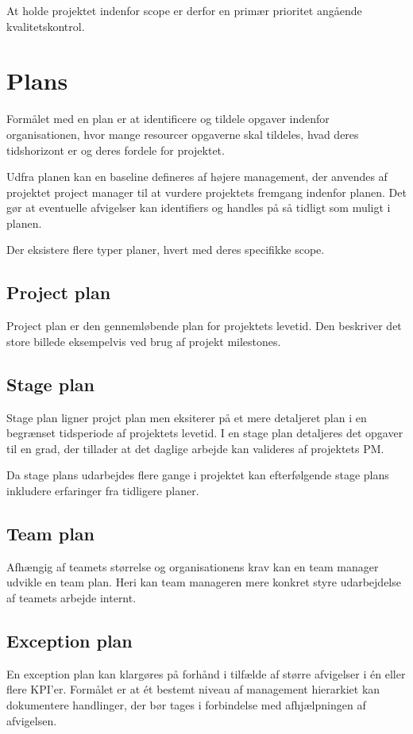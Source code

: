 At holde projektet indenfor scope er derfor en primær prioritet angående kvalitetskontrol.

\section{Plans}
\label{sec:plans}
Formålet med en plan er at identificere og tildele opgaver indenfor organisationen, hvor mange resourcer opgaverne skal tildeles, hvad deres tidshorizont er og deres fordele for projektet.

Udfra planen kan en baseline defineres af højere management, der anvendes af projektet project manager til at vurdere projektets fremgang indenfor planen. Det gør at eventuelle afvigelser kan identifiers og handles på så tidligt som muligt i planen.

Der eksistere flere typer planer, hvert med deres specifikke scope.

\subsection*{Project plan}
Project plan er den gennemløbende plan for projektets levetid. Den beskriver det store billede eksempelvis ved brug af projekt milestones.

\subsection*{Stage plan}
Stage plan ligner projct plan men eksiterer på et mere detaljeret plan i en begrænset tidsperiode af projektets levetid. I en stage plan detaljeres det opgaver til en grad, der tillader at det daglige arbejde kan valideres af projektets PM.

Da stage plans udarbejdes flere gange i projektet kan efterfølgende stage plans inkludere erfaringer fra tidligere planer.

\subsection*{Team plan}
Afhængig af teamets størrelse og organisationens krav kan en team manager udvikle en team plan. Heri kan team manageren mere konkret styre udarbejdelse af teamets arbejde internt. 

\subsection*{Exception plan}
En exception plan kan klargøres på forhånd i tilfælde af større afvigelser i én eller flere KPI'er. Formålet er at ét bestemt niveau af management hierarkiet kan dokumentere handlinger, der bør tages i forbindelse med afhjælpningen af afvigelsen.

